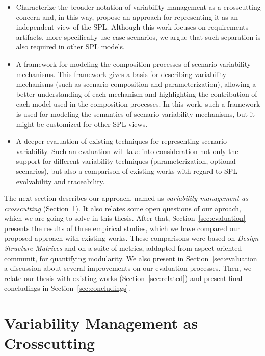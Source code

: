 \documentclass[times, 11pt,twocolumn]{article}
\begin{document}
\begin{itemize}
 \item Characterize the broader notation of variability management as
a crosscutting concern and, in this way, propose an approach for
representing it as an independent view of the SPL. Although
this work focuses on requirements artifacts, more specifically
use case scenarios, we argue that such separation is also required
in other SPL models.
 \item A framework for modeling the composition processes of scenario
variability mechanisms. This framework gives a basis for
describing variability mechanisms (such as scenario composition
and parameterization), allowing a better understanding of each mechanism and
highlighting the contribution of each model used in the composition processes.
In this work, such a framework is used for modeling the semantics of scenario variability mechanisms, but it
might be customized for other SPL views.
 \item A deeper evaluation of existing techniques for representing scenario
 variability. Such an evaluation will take into consideration not only the
 support for different variability techniques (parameterization, optional
 scenarios), but also a comparison of existing works with regard to
 SPL evolvability and traceability.  
\end{itemize}

The next section describes our approach, named as \emph{variability management
as crosscutting} (Section~\ref{sec:vmcc}). It also relates some open questions
of our aproach, which we are going to solve in this thesis. After that,
Section~\ref{sec:evaluation} presents the results of three empirical studies,
which we have compared our proposed approach with existing
works. These comparisons were based on \emph{Design Structure Matrices} and on a
suite of metrics, addapted from aspect-oriented communit, for quantifying modularity.
We also present in Section~\ref{sec:evaluation} a discussion about several
improvements on our evaluation processes. Then, we relate our
thesis with existing works (Section~\ref{sec:related}) and present final concludings 
in Section~\ref{sec:concludings}.

\section{Variability Management as Crosscutting}\label{sec:vmcc}
\end{document}
